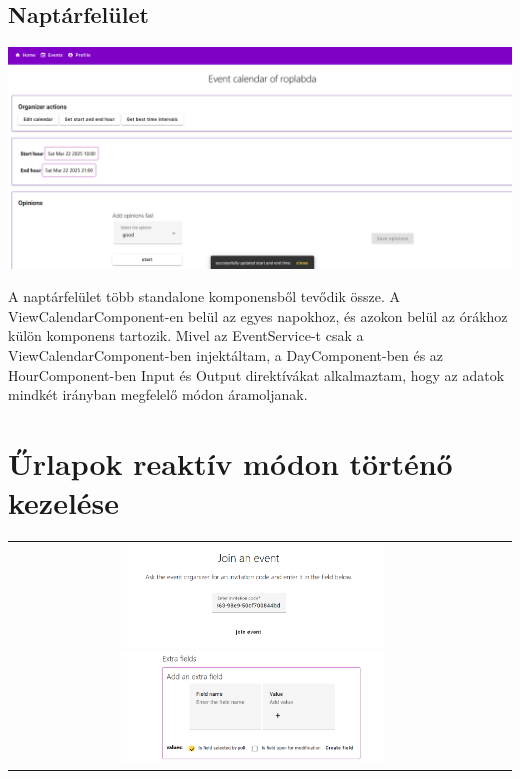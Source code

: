 \documentclass[a4paper,12pt]{report}
\theoremstyle{definition}
\theoremstyle{remark}
\begin{document}
	\subsection{Naptárfelület}

\begin{center}
\includegraphics[width=150mm]{calendar_editor}
\captionsetup{width=0.8\linewidth}
\end{center}

A naptárfelület több standalone komponensből tevődik össze. A ViewCalendarComponent-en belül az egyes napokhoz, és azokon belül az órákhoz külön komponens tartozik. Mivel az EventService-t csak a ViewCalendarComponent-ben injektáltam, a DayComponent-ben és az HourComponent-ben Input és Output direktívákat alkalmaztam, hogy az adatok mindkét irányban megfelelő módon áramoljanak.

\section{Űrlapok reaktív módon történő kezelése}

\begin{center}
\begin{tabular}{cc}
\includegraphics[width=70mm]{join_event}
\includegraphics[width=70mm]{extra_field_form}
\end{tabular}
\captionsetup{width=0.8\linewidth}
\end{center}
\end{document}
